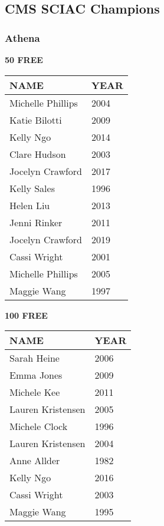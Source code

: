 \vspace{0.4cm}

\newpage

\subsection{CMS SCIAC Champions}
\subsubsection{Athena}

\begin{minipage}[t]{0.48\textwidth}
\centering
\textbf{50 FREE}\\[0.05cm]
\begin{tabular}{@{}p{2.8cm}p{1.2cm}@{}}
\hline
\textbf{NAME} & \textbf{YEAR} \\
\hline
Michelle Phillips & 2004 \\
Katie Bilotti & 2009 \\
Kelly Ngo & 2014 \\
Clare Hudson & 2003 \\
Jocelyn Crawford & 2017 \\
Kelly Sales & 1996 \\
Helen Liu & 2013 \\
Jenni Rinker & 2011 \\
Jocelyn Crawford & 2019 \\
Cassi Wright & 2001 \\
Michelle Phillips & 2005 \\
Maggie Wang & 1997 \\
\hline
\end{tabular}
\end{minipage}\hfill
\begin{minipage}[t]{0.48\textwidth}
\centering
\textbf{100 FREE}\\[0.05cm]
\begin{tabular}{@{}p{2.8cm}p{1.2cm}@{}}
\hline
\textbf{NAME} & \textbf{YEAR} \\
\hline
Sarah Heine & 2006 \\
Emma Jones & 2009 \\
Michele Kee & 2011 \\
Lauren Kristensen & 2005 \\
Michele Clock & 1996 \\
Lauren Kristensen & 2004 \\
Anne Allder & 1982 \\
Kelly Ngo & 2016 \\
Cassi Wright & 2003 \\
Maggie Wang & 1995 \\
\hline
\end{tabular}
\end{minipage}

